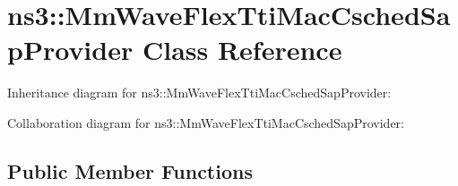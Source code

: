 \hypertarget{classns3_1_1MmWaveFlexTtiMacCschedSapProvider}{}\section{ns3\+:\+:Mm\+Wave\+Flex\+Tti\+Mac\+Csched\+Sap\+Provider Class Reference}
\label{classns3_1_1MmWaveFlexTtiMacCschedSapProvider}


Inheritance diagram for ns3\+:\+:Mm\+Wave\+Flex\+Tti\+Mac\+Csched\+Sap\+Provider\+:


Collaboration diagram for ns3\+:\+:Mm\+Wave\+Flex\+Tti\+Mac\+Csched\+Sap\+Provider\+:
\subsection*{Public Member Functions}
